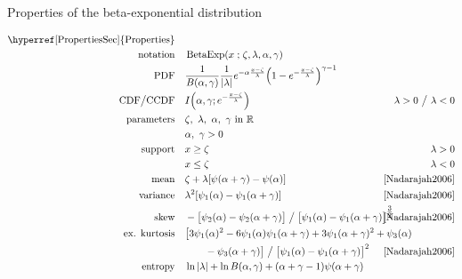 

\begin{table*}[tp!]
\caption[Beta-exponential distribution -- Properties]{Properties of the beta-exponential distribution}
\begin{align*}
\text{\hyperref[PropertiesSec]{Properties}}  \quad& \\
\text{notation} \quad & \op{BetaExp}(x\given \pLoc,\pScale,\alpha, \gamma)  \checked
\\
\text{PDF}\quad &   \frac{1}{B(\alpha, \gamma)} \frac{1}{|\pScale|} e^{-\alpha \frac{x-\pLoc}{\pScale} }  \Left(1 - e^{-\frac{x-\pLoc}{\pScale}  }\Right)^{\gamma-1}  \checked
\\
\text{CDF} \big/ \text{CCDF} \quad  & I\Left(\alpha,\gamma; e^{-\frac{x-\pLoc}{\pScale}} \Right)\checked & \hspace{-2em}\pScale>0 \ \big/ \ \pScale<0
\\
\text{parameters}\quad &   \pLoc,\ \pScale,\ \alpha,\  \gamma \text{ in } \Real	\checked \\
& \alpha,\ \gamma >0	\checked
\\
\text{support} \quad &     x \geq \pLoc \checked&  \pScale > 0
\\
&   x\leq \pLoc  \checked&  \pScale < 0 
\\
\text{mean} \quad  &  \pLoc+ \pScale [\psi(\alpha+\gamma) -\psi(\alpha)  ]  \checked & \text{\cite{Nadarajah2006}}
\\
\text{variance} \quad  & \pScale^2 [\psi_1(\alpha)-\psi_1(\alpha+\gamma) ]  \checked & \text{\cite{Nadarajah2006}}
\\
\text{skew} \quad  &-\bigl[{\psi_2(\alpha)-\psi_2(\alpha+\gamma)}\bigr] \bigm/ {  \bigl[\psi_1(\alpha)-\psi_1(\alpha+\gamma) \bigr]^{\tfrac{3}{2}} } \checked \hspace{-2em} &  \text{\cite{Nadarajah2006}}
\\
\text{ex. kurtosis} \quad  &
\bigl[3\psi_1(\alpha)^2- 6\psi_1(\alpha)\psi_1(\alpha+\gamma)+ 3\psi_1(\alpha+\gamma)^2+\psi_3(\alpha)
\hspace{-4em} \\ &\qquad -\psi_3(\alpha+\gamma)\bigr] \bigm/ \bigl[ \psi_1(\alpha)-\psi_1(\alpha+\gamma) \bigr]^2
\checked	
 				&  \text{\cite{Nadarajah2006}}
\\
\text{entropy} \quad  & \ln |\pScale| +\ln B(\alpha,\gamma) + (\alpha+\gamma-1) \psi(\alpha+\gamma) 

\end{align*}
\end{table*}
